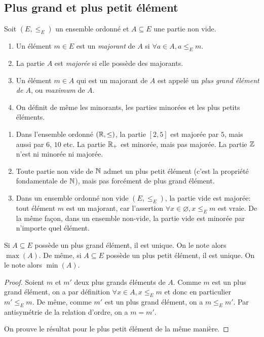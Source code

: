 \subsection{Plus grand et plus petit élément}
\begin{definition}
Soit $(E,\leq_E)$ un ensemble ordonné et $A\subseteq E$ une partie non vide.
\begin{enumerate}
\item Un élément $m\in E$ est un \emph{majorant} de $A$ si $\forall a\in A, a\leq_E m$.
\item La partie $A$ est \emph{majorée} si elle possède des majorants.
\item Un élément $m\in A$ qui est un majorant de $A$ est appelé un \emph{plus grand élément de $A$}, ou \emph{maximum} de $A$.
\item On définit de même les minorants, les parties minorées et les plus petits éléments.
\end{enumerate}
\end{definition}

\begin{exemple}
\begin{enumerate}[label=\alph*)]
\item Dans l'ensemble ordonné $(\mathbb{R},\leq)$, la partie $[2,5]$ est majorée par $5$, mais aussi par $6$, $10$ etc. La partie $\mathbb{R}_+$ est minorée, mais pas majorée. La partie $\mathbb{Z}$ n'est ni minorée ni majorée.
\item Toute partie non vide de $\mathbb{N}$ admet un plus petit élément (c'est la propriété fondamentale de $\mathbb{N}$), mais pas forcément de plus grand élément.
\item Dans un ensemble ordonné non vide $(E,\leq_E)$, la partie vide est majorée: tout élément $m$ est un majorant, car l'assertion $\forall x\in \varnothing, x\leq_E m$ est vraie. De la même façon, dans un ensemble non-vide, la partie vide est minorée par n'importe quel élément.
\end{enumerate}
\end{exemple}



\begin{proposition}
Si $A\subseteq E$ possède un plus grand élément, il est unique. On le note alors $\max(A)$.
De même, si $A\subseteq E$ possède un plus petit élément, il est unique. On le note alors $\min(A)$.
\end{proposition}
\begin{proof}
Soient $m$ et $m'$ deux plus grands éléments de $A$. Comme $m$ est un plus grand élément, on a par définition $\forall x\in A, x\leq_E m$ et donc en particulier $m'\leq_E m$. De même, comme $m'$ est un plus grand élément, on a $m\leq_E m'$. Par antisymétrie de la relation d'ordre, on a $m=m'$.

On prouve le résultat pour le plus petit élément de la même manière.
\end{proof}

